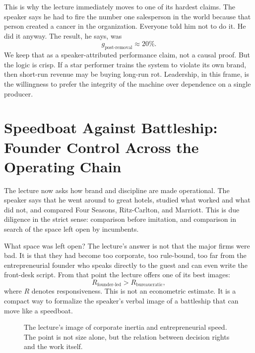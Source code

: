 This is why the lecture immediately moves to one of its hardest claims. The speaker says he had to fire the number one salesperson in the world because that person created a cancer in the organization. Everyone told him not to do it. He did it anyway. The result, he says, was
\begin{equation}
g_{\mathrm{post\text{-}removal}}\approx 20\%.
\end{equation}
We keep that as a speaker-attributed performance claim, not a causal proof. But the logic is crisp. If a star performer trains the system to violate its own brand, then short-run revenue may be buying long-run rot. Leadership, in this frame, is the willingness to prefer the integrity of the machine over dependence on a single producer.

\section{Speedboat Against Battleship: Founder Control Across the Operating Chain}

The lecture now asks how brand and discipline are made operational. The speaker says that he went around to great hotels, studied what worked and what did not, and compared Four Seasons, Ritz-Carlton, and Marriott. This is due diligence in the strict sense: comparison before imitation, and comparison in search of the space left open by incumbents.

What space was left open? The lecture's answer is not that the major firms were bad. It is that they had become too corporate, too rule-bound, too far from the entrepreneurial founder who speaks directly to the guest and can even write the front-desk script. From that point the lecture offers one of its best images:
\begin{equation}
R_{\mathrm{founder\text{-}led}} > R_{\mathrm{bureaucratic}},
\end{equation}
where \(R\) denotes responsiveness. This is not an econometric estimate. It is a compact way to formalize the speaker's verbal image of a battleship that can move like a speedboat.

\begin{figure}[h]
\centering
{}
\caption{The lecture's image of corporate inertia and entrepreneurial speed. The point is not size alone, but the relation between decision rights and the work itself.}
\end{figure}

